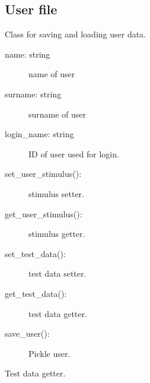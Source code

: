 \documentclass[letterpaper,10pt,english]{sphinxmanual}
\begin{document}
\subsection{User file}
\label{\detokenize{modules:module-src.user}}\label{\detokenize{modules:user-file}}

\begin{fulllineitems}
\label{\detokenize{modules:src.user.User}}
\sphinxAtStartPar
Class for saving and loading user data.
\begin{description}
\item[{name: string}] \leavevmode
\sphinxAtStartPar
name of user

\item[{surname: string}] \leavevmode
\sphinxAtStartPar
surname of user

\item[{login\_name: string}] \leavevmode
\sphinxAtStartPar
ID of user used for login.

\end{description}
\begin{description}
\item[{set\_user\_stimulus():}] \leavevmode
\sphinxAtStartPar
stimulus setter.

\item[{get\_user\_stimulus():}] \leavevmode
\sphinxAtStartPar
stimulus getter.

\item[{set\_test\_data():}] \leavevmode
\sphinxAtStartPar
test data setter.

\item[{get\_test\_data():}] \leavevmode
\sphinxAtStartPar
test data getter.

\item[{save\_user():}] \leavevmode
\sphinxAtStartPar
Pickle user.

\end{description}

\begin{fulllineitems}
\label{\detokenize{modules:src.user.User.get_test_data}}
\sphinxAtStartPar
Test data getter.


\end{fulllineitems}
\end{fulllineitems}
\end{document}
